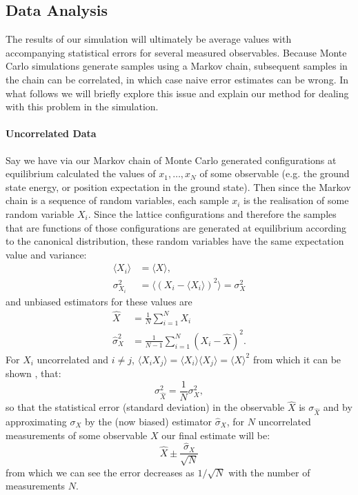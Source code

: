 \documentclass[12pt]{article}
\begin{document}
        \subsection{Data Analysis}
        The results of our simulation will ultimately be average values with accompanying statistical errors for several measured observables. Because Monte Carlo simulations generate samples using a Markov chain, subsequent samples in the chain can be correlated, in which case naive error estimates can be wrong. In what follows we will briefly explore this issue and explain our method for dealing with this problem in the simulation.

            \paragraph{Uncorrelated Data}
            Say we have via our Markov chain of Monte Carlo generated configurations at equilibrium calculated the values of $x_1,\dots,x_N$ of some observable (e.g. the ground state energy, or position expectation in the ground state). Then since the Markov chain is a sequence of random variables, each sample $x_i$ is the realisation of some random variable $X_i$. Since the lattice configurations and therefore the samples that are functions of those configurations are generated at equilibrium according to the canonical distribution, these random variables have the same expectation value and variance:
            \begin{align}
                \langle X_i \rangle & = \langle X \rangle, \\
                \sigma^2_{X_i} & = \langle \left(X_i-\langle X_i\rangle\right)^2 \rangle = \sigma_X^2
            \end{align}
            and unbiased estimators for these values are \cite{gattringer_lang_2013}
            \begin{align}
                \hat{X} & = \frac{1}{N}\sum_{i=1}^{N} X_i \\
                \hat{\sigma}_X^2 & = \frac{1}{N-1}\sum_{i=1}^N\left(X_i-\hat{X}\right)^2.
            \end{align}
            For $X_i$ uncorrelated and $i\neq j$, $\langle X_iX_j \rangle = \langle X_i \rangle \langle X_j \rangle = \langle X \rangle^2$ from which it can be shown \cite{gattringer_lang_2013}, that:
            \begin{equation}
                \label{eq:sdRelation1}
                \sigma^2_{\hat{X}} = \frac{1}{N}\sigma^2_X,
            \end{equation}
            so that the statistical error (standard deviation) in the observable $\hat{X}$ is $\sigma_{\hat{X}}$ and by approximating $\sigma_X$ by the (now biased) estimator $\hat{\sigma}_X$, for $N$ uncorrelated measurements of some observable $X$ our final estimate will be:
            \begin{equation}
                \label{eq:niaveerror}
                \hat{X}\pm \frac{\hat{\sigma}_X}{\sqrt{N}}
            \end{equation}
            from which we can see the error decreases as $1/\sqrt{N}$ with the number of measurements $N$.
\end{document}
